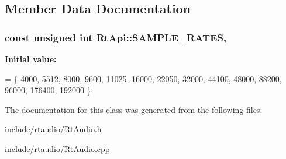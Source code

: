 \subsection{Member Data Documentation}
\subsubsection[{S\+A\+M\+P\+L\+E\+\_\+\+R\+A\+T\+ES}]{\setlength{\rightskip}{0pt plus 5cm}const unsigned int Rt\+Api\+::\+S\+A\+M\+P\+L\+E\+\_\+\+R\+A\+T\+ES\hspace{0.3cm}{\ttfamily [static]}, {\ttfamily [protected]}}\hypertarget{class_rt_api_a84f89655b9f487005d10929ff9453ad2}{}\label{class_rt_api_a84f89655b9f487005d10929ff9453ad2}
{\bfseries Initial value\+:}
\begin{DoxyCode}
= \{
  4000, 5512, 8000, 9600, 11025, 16000, 22050,
  32000, 44100, 48000, 88200, 96000, 176400, 192000
\}
\end{DoxyCode}


The documentation for this class was generated from the following files\+:\begin{DoxyCompactItemize}
\item 
include/rtaudio/\hyperlink{_rt_audio_8h}{Rt\+Audio.\+h}\item 
include/rtaudio/Rt\+Audio.\+cpp\end{DoxyCompactItemize}
